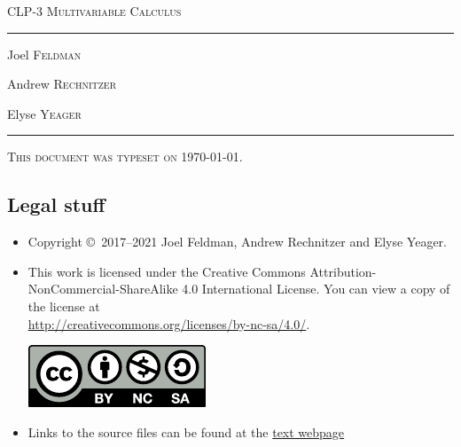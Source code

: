 \documentclass[12pt,letterpaper, openany]{book}
\begin{document}
\setcounter{page}{0}

\begin{titlepage}
\begin{center}
\textsc{\LARGE
CLP-3 Multivariable Calculus
}\\[2ex]

\vspace{5ex}
\hrule
\vspace{5ex}

\begin{minipage}[t]{0.3\textwidth} \begin{flushleft}
\large Joel \textsc{Feldman}
\end{flushleft} \end{minipage}%
\begin{minipage}[t]{0.3\textwidth} \begin{flushleft}
\large Andrew \textsc{Rechnitzer}
\end{flushleft} \end{minipage}%
\begin{minipage}[t]{0.3\textwidth} \begin{flushright}
\large Elyse \textsc{Yeager}
\end{flushright} \end{minipage}%
\end{center}
\vspace{2ex}
\hrule

\vfill
\textsc{This document was typeset on \today.}
\end{titlepage}

\subsection*{Legal stuff}
\begin{itemize}
 \item Copyright \copyright\ 2017--2021 Joel Feldman, Andrew Rechnitzer and Elyse Yeager.
\item This work is licensed under the
Creative Commons Attribution-NonCommercial-ShareAlike 4.0 International
License. You can view a copy of the license at \\
\url{http://creativecommons.org/licenses/by-nc-sa/4.0/}.
\begin{center}
 \includegraphics{by-nc-sa.pdf}
\end{center}
\item Links to the source files can be found at the \href{http://www.math.ubc.ca/~CLP/index.html}{text webpage}
\end{itemize}
\end{document}
